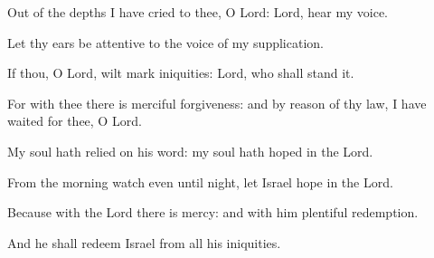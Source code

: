 \item Out of the depths I have cried to thee, O Lord: Lord, hear my voice.
\item Let thy ears be attentive to the voice of my supplication.
\item If thou, O Lord, wilt mark iniquities: Lord, who shall stand it.
\item For with thee there is merciful forgiveness: and by reason of thy law, I have waited for thee, O Lord.
\item My soul hath relied on his word: my soul hath hoped in the Lord.
\item From the morning watch even until night, let Israel hope in the Lord.
\item Because with the Lord there is mercy: and with him plentiful redemption.
\item And he shall redeem Israel from all his iniquities.